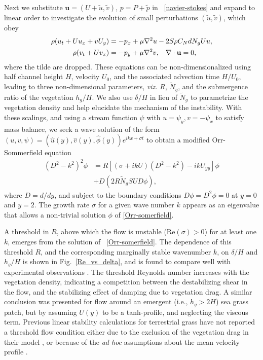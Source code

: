 \documentclass[aps,prl,twocolumn,superscriptaddress,sort&compress,10pt]{revtex4-1}  %
\newcommand{\bu}{\mathbf{u}}
\newcommand{\hg}{h_g}
\newcommand{\Rey}{{R}}
\newcommand{\Ndg}{\tilde{N}_g}
\begin{document}
Next we substitute $\bu = (U+\tilde{u}, \tilde{v})$, $p=P+\tilde{p}$ in ~\eqref{navier-stokes} and expand to linear order to investigate the evolution of small perturbations $(\tilde{u}, \tilde{v})$, which obey
\begin{equation}
\begin{split}
\rho(u_t+U u_x+vU_y) &= -p_x+ {\mu}\nabla^2u-2S\rho C_{N}dN_{g}Uu, \\
\rho(v_t+ Uv_x) &= -p_y+ {\mu}\nabla^2v, \hspace{0.3cm} \nabla\cdot\bu=0,
\end{split} \nonumber
\end{equation}
where the tilde are dropped.
These equations can be non-dimensionalized using half channel height $H$, velocity $U_0$, and the associated advection time $H/U_0$, leading to three non-dimensional parameters, \textit{viz.} $\Rey$, $\Ndg$, and the submergence ratio of the vegetation $h_g/H$. 
We also use $\delta/H$ in lieu of $\Ndg$ to parametrize the vegetation density and help elucidate the mechanism of the instability. 
With these scalings, and using a stream function $\psi$ with $u = \psi_{y}, v= -\psi_x$ to satisfy mass balance, we seek a wave solution of 
the form $\left(u,v,\psi \right)= \left(\hat u(y), \hat v(y), \hat\phi(y) \right)e^{ikx+\sigma t}$ to  obtain a modified Orr-Sommerfield equation \cite{Drazin81} 
\begin{equation}
\begin{split}
\left(D^2 -k^{2} \right)^2\phi &= \Rey \left[ \left({\sigma}+ikU\right) \left(D^2-k^2\right) -ikU_{yy}\right]\phi \\
&+D\left(2R \Ndg S U D \phi\right),
\label{Orr-somerfield}
\end{split}
\end{equation}
where $D=d/dy$, and subject to the boundary conditions $D\phi = D^2\phi = 0$ at $y=0$ and $y=2$. 
The growth rate $\sigma$ for a given wave number $k$ appears as an eigenvalue that allows a non-trivial solution $\phi$ of  \eqref{Orr-somerfield}.

A threshold in $\Rey$, above which the flow is unstable (Re$(\sigma)>0$) for at least one $k$, emerges from the 
solution of ~\eqref{Orr-somerfield}. The dependence of this threshold $\Rey$, and the corresponding marginally stable wavenumber $k$, on $\delta/H$ and $\hg/H$ is shown in Fig.~\ref{Re_vs_delta}, and is found to compare well with experimental observations \cite{Ghisal02}.
The threshold Reynolds number increases with the vegetation density, indicating a competition between the destabilizing shear in the flow, and the stabilizing effect of damping due to vegetation drag.
A similar conclusion was presented \cite{White07} for flow around an emergent (i.e., $\hg>2H$) sea grass patch, but by assuming $U(y)$ to be a tanh-profile, and neglecting the viscous term.
Previous linear stability calculations for terrestrial grass have not reported a threshold flow condition either due to the exclusion of the vegetation drag in their model \cite{Raupach96}, or because of the \textit{ad hoc} assumptions about the mean velocity profile \cite{Raupach96,Delangre06}. 
\end{document}
